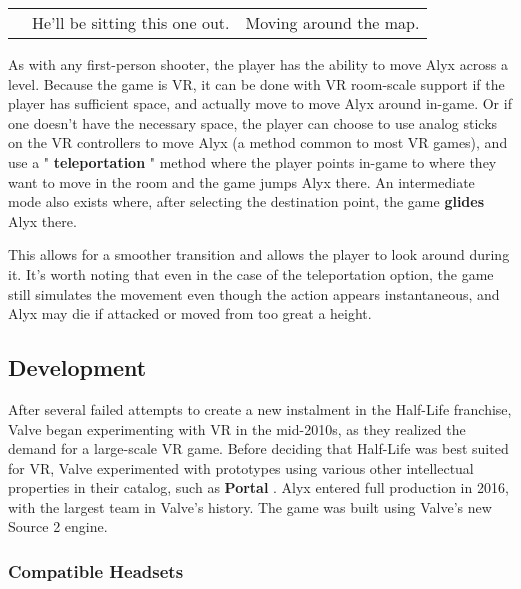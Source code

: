 \documentclass[a4paper,10pt]{book}
\begin{document}
 \begin{longtable}{p{1mm}|l|l|}\hline
 
 & 
 & 
 \\\hline
 
 & He'll be sitting this one out. 
 & Moving around the map. 
 \\\hline
 \end{longtable}
 
         As with any first-person shooter, the player has the ability to move Alyx across a level.
         Because the game is VR, it can be done with VR room-scale support if the player has sufficient space, and actually move to move Alyx around in-game.
         Or if one doesn't have the necessary space, the player can choose to use analog sticks on the VR controllers to move Alyx
         (a method common to most VR games), and use a " \textbf{teleportation } " method where the player points in-game to where they want to move in the room and the game jumps Alyx there.
         An intermediate mode also exists where, after selecting the destination point, the game  \textbf{glides }  Alyx there.
        
 
         This allows for a smoother transition and allows the player to look around during it.
         It's worth noting that even in the case of the teleportation option, the game still simulates the movement even though the action appears instantaneous,
         and Alyx may die if attacked or moved from too great a height.
        
 \subsection{Development }
 
         After several failed attempts to create a new instalment in the Half-Life franchise, Valve began experimenting with VR in the mid-2010s, as they realized the demand for a large-scale VR game.
         Before deciding that Half-Life was best suited for VR, Valve experimented with prototypes using various other intellectual properties in their catalog, such as  \textbf{Portal } .
         Alyx entered full production in 2016, with the largest team in Valve's history. The game was built using Valve's new Source 2 engine.
        
 \subsubsection{Compatible Headsets }
 
\end{document}
